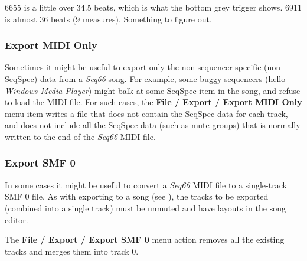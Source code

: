    6655 is a little over 34.5 beats, which is what the bottom grey trigger
   shows.
   6911 is almost 36 beats (9 measures).  Something to figure out.

\subsubsection{Export MIDI Only}
\label{subsubsec:midi_export_file_export_midi_only}

   Sometimes it might be useful to export only the non-sequencer-specific
   (non-SeqSpec) data from a \textsl{Seq66} song.
   For example, some buggy sequencers
   (hello \textsl{Windows Media Player})
   might balk at some SeqSpec item in the song, and refuse to load the MIDI
   file.
   For such cases,
   the \textbf{File / Export / Export MIDI Only} menu
   item writes a file that does not contain
   the SeqSpec data for each track, and does not include all the SeqSpec data
   (such as mute groups) that is normally written to the end of the
   \textsl{Seq66} MIDI file.

\subsubsection{Export SMF 0}
\label{subsubsec:midi_export_file_export_smf_0}

   In some cases it might be useful to convert a \textsl{Seq66} MIDI file to a
   single-track SMF 0 file.
   As with exporting to a song
   (see ),
   the tracks to be exported (combined into a single track) must be unmuted
   and have layouts in the song editor.

   The \textbf{File / Export / Export SMF 0 } menu
   action removes all the existing tracks and merges them into track 0.

